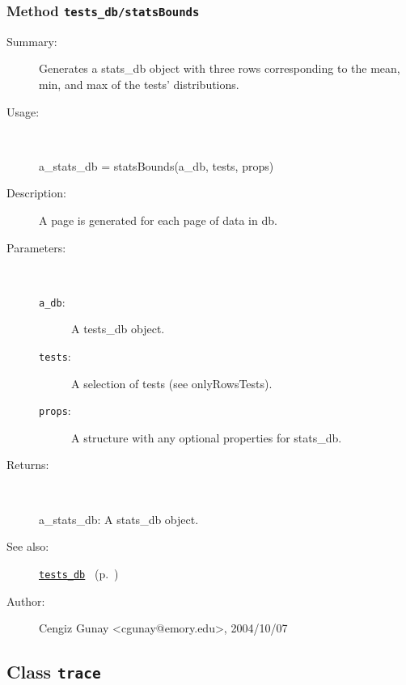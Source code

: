 \subsubsection[Method \texttt{statsBounds}]{Method \texttt{tests\_db/statsBounds}}%
%
\label{ref_tests_db__statsBounds}%
\hypertarget{ref_tests_db__statsBounds}{}%
\begin{description}
\item[Summary:]Generates a stats\_db object with three rows corresponding to the mean, min, and max of the tests' distributions. 
%
\item[Usage:]~%
\begin{lyxcode}%
a\_stats\_db = statsBounds(a\_db, tests, props)
%
\end{lyxcode}%
%
\item[Description:]%
A page is generated for each page of data in db.
\item[Parameters:]~
\begin{description}%
\item[\texttt{a\_db}:]
 A tests\_db object.
\item[\texttt{tests}:]
 A selection of tests (see onlyRowsTests).
\item[\texttt{props}:]
 A structure with any optional properties for stats\_db.
\end{description}%
%
\item[Returns:]~

	a\_stats\_db: A stats\_db object.
%
%
\item[See also:]%
\hyperlink{ref_tests_db}{\texttt{tests\_db}}%
\ (p.~\pageref{ref_tests_db})%
%
%
\item[Author:]%
Cengiz Gunay <cgunay@emory.edu>, 2004/10/07%
\end{description}
\methodline%
\subsection{Class \texttt{trace}}%
%
\label{ref_trace}%
\hypertarget{ref_trace}{}%
